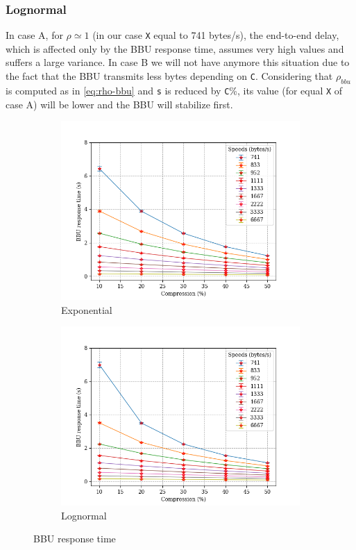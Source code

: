 \documentclass[11pt,a4paper,oneside, openright]{article}
\begin{document}
\subsubsection{Lognormal}
In case A, for $\rho \simeq 1$ (in our case \texttt{X} equal to 741 bytes/s), the end-to-end delay, which is affected only by the BBU response time, assumes very high values and suffers a large variance. In case B we will not have anymore this situation due to the fact that the BBU transmits less bytes depending on \texttt{C}. Considering that $\rho_{bbu}$ is computed as in \ref{eq:rho-bbu} and \texttt{s} is reduced by \texttt{C}\%, its value (for equal \texttt{X} of case A) will be lower and the BBU will stabilize first.
\begin{figure}[h]
	\centering
	\begin{subfigure}{.5\textwidth}
		\centering
		\includegraphics[width=\linewidth]{images/bbu-exp}
		\caption{Exponential}
		\label{fig:exponential-bbu-response}
	\end{subfigure}%
	\begin{subfigure}{.5\textwidth}
		\centering
		\includegraphics[width=\linewidth]{images/bbu-logn}
		\caption{Lognormal}
		\label{fig:lognormal-bbu-response}
	\end{subfigure}
	\caption{BBU response time}
	\label{fig:bbu-response}
\end{figure}
\end{document}
